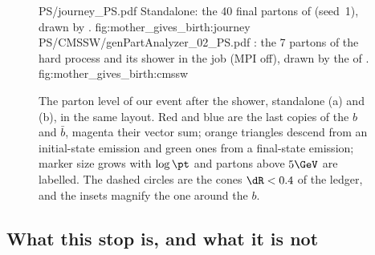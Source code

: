 \begin{figure}[p]\centering
\ledgerdisplays
  {PS/journey_PS.pdf}
  {Standalone: the 40 final partons of  (seed~1), drawn by .}
  {fig:mother_gives_birth:journey}
  {PS/CMSSW/genPartAnalyzer_02_PS.pdf}
  {\CMSSW: the 7 partons of the hard process and its shower in the  job (MPI off), drawn by the  of .}
  {fig:mother_gives_birth:cmssw}
\caption[The showered event in the $(\eta,\phi)$ plane, standalone and
\CMSSW]{The parton level of our event after the shower, standalone (a) and
\CMSSW (b), in the same layout. Red and blue are the last copies of the
$b$ and $\bar b$, magenta their vector sum; orange triangles descend from
an initial-state emission and green ones from a final-state emission;
marker size grows with $\log\pt$ and partons above $5\GeV$ are labelled.
The dashed circles are the cones $\dR<0.4$ of the ledger, and the insets
magnify the one around the $b$.}
\label{fig:mother_gives_birth:displays}
\end{figure}

\subsection{What this stop is, and what it is not}
\label{sec:mother_gives_birth:caveats}

